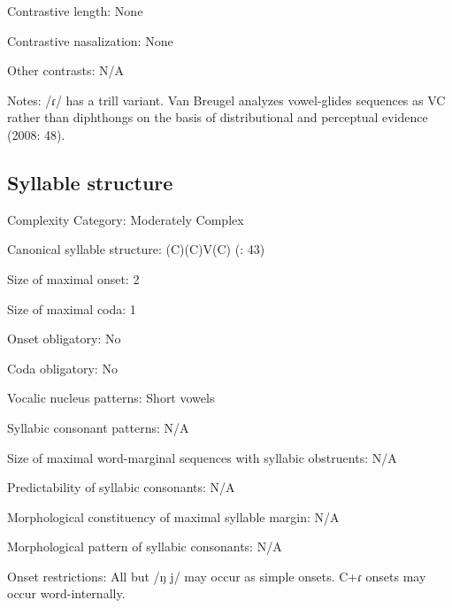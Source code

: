 {\begin{appendixdesc}
\item[Contrastive length:] None

\item[Contrastive nasalization:] None

\item[Other contrasts:] N/A

\item[Notes:] /ɾ/ has a trill variant. Van Breugel analyzes vowel-glides sequences as VC rather than diphthongs on the basis of distributional and perceptual evidence (2008: 48).
\end{appendixdesc}
\subsection*{Syllable structure}
\begin{appendixdesc}

\item[Complexity Category:] Moderately Complex

\item[Canonical syllable structure:] (C)(C)V(C) (\citealt{VanBreugel2008}: 43)

\item[Size of maximal onset:] 2

\item[Size of maximal coda:] 1

\item[Onset obligatory:] No

\item[Coda obligatory:] No

\item[Vocalic nucleus patterns:] Short vowels

\item[Syllabic consonant patterns:] N/A

\item[Size of maximal word-marginal sequences with syllabic obstruents:] N/A

\item[Predictability of syllabic consonants:] N/A

\item[Morphological constituency of maximal syllable margin:] N/A

\item[Morphological pattern of syllabic consonants:] N/A

\item[Onset restrictions:] All but /ŋ j/ may occur as simple onsets. C+ɾ onsets may occur word-internally.


\end{appendixdesc}}
